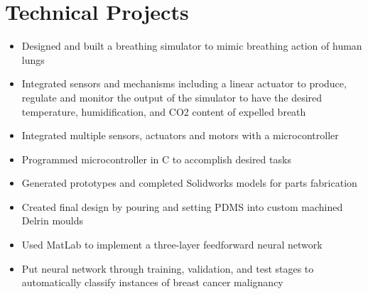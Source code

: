 \documentclass[11pt,a4paper,sans]{moderncv}        %
\begin{document}
\section{Technical Projects}
\begin{itemize}%
	\item Designed and built a breathing simulator to mimic breathing action of human lungs
	\item Integrated sensors and mechanisms including a linear actuator to produce, regulate and monitor the output of the simulator to have the desired temperature, humidification, and CO2 content of expelled breath
\end{itemize}
\begin{itemize}%
	\item Integrated multiple sensors, actuators and motors with a microcontroller
	\item Programmed microcontroller in C to accomplish desired tasks
\end{itemize}
\begin{itemize}%
	\item Generated prototypes and completed Solidworks models for parts fabrication 
	\item Created final design by pouring and setting PDMS into custom machined Delrin moulds
\end{itemize}
\begin{itemize}%
	\item Used MatLab to implement a three-layer feedforward neural network
	\item Put neural network through training, validation, and test stages to automatically classify instances of breast cancer malignancy
\end{itemize}
\end{document}
